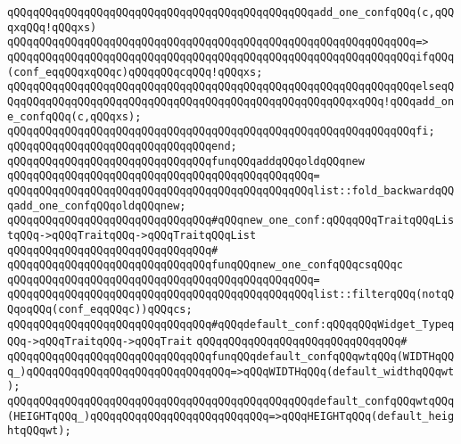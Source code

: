 \newline
\verb|qQQqqQQqqQQqqQQqqQQqqQQqqQQqqQQqqQQqqQQqqQQqqQQqadd_one_confqQQq(c,qQQqxqQQq!qQQqxs)|\newline
\verb|qQQqqQQqqQQqqQQqqQQqqQQqqQQqqQQqqQQqqQQqqQQqqQQqqQQqqQQqqQQqqQQq=>|\newline
\verb|qQQqqQQqqQQqqQQqqQQqqQQqqQQqqQQqqQQqqQQqqQQqqQQqqQQqqQQqqQQqqQQqifqQQq(conf_eqqQQqxqQQqc)qQQqqQQqcqQQq!qQQqxs;|\newline
\verb|qQQqqQQqqQQqqQQqqQQqqQQqqQQqqQQqqQQqqQQqqQQqqQQqqQQqqQQqqQQqqQQqelseqQQqqQQqqQQqqQQqqQQqqQQqqQQqqQQqqQQqqQQqqQQqqQQqqQQqqQQqxqQQq!qQQqadd_one_confqQQq(c,qQQqxs);|\newline
\verb|qQQqqQQqqQQqqQQqqQQqqQQqqQQqqQQqqQQqqQQqqQQqqQQqqQQqqQQqqQQqqQQqfi;|\newline
\verb|qQQqqQQqqQQqqQQqqQQqqQQqqQQqqQQqend;|\newline
\newline
\verb|qQQqqQQqqQQqqQQqqQQqqQQqqQQqqQQqfunqQQqaddqQQqoldqQQqnew|\newline
\verb|qQQqqQQqqQQqqQQqqQQqqQQqqQQqqQQqqQQqqQQqqQQqqQQq=|\newline
\verb|qQQqqQQqqQQqqQQqqQQqqQQqqQQqqQQqqQQqqQQqqQQqqQQqlist::fold_backwardqQQqadd_one_confqQQqoldqQQqnew;|\newline
\newline
\verb|qQQqqQQqqQQqqQQqqQQqqQQqqQQqqQQq#qQQqnew_one_conf:qQQqqQQqTraitqQQqListqQQq->qQQqTraitqQQq->qQQqTraitqQQqList|\newline
\verb|qQQqqQQqqQQqqQQqqQQqqQQqqQQqqQQq#|\newline
\verb|qQQqqQQqqQQqqQQqqQQqqQQqqQQqqQQqfunqQQqnew_one_confqQQqcsqQQqc|\newline
\verb|qQQqqQQqqQQqqQQqqQQqqQQqqQQqqQQqqQQqqQQqqQQqqQQq=|\newline
\verb|qQQqqQQqqQQqqQQqqQQqqQQqqQQqqQQqqQQqqQQqqQQqqQQqlist::filterqQQq(notqQQqoqQQq(conf_eqqQQqc))qQQqcs;|\newline
\newline
\verb|qQQqqQQqqQQqqQQqqQQqqQQqqQQqqQQq#qQQqdefault_conf:qQQqqQQqWidget_TypeqQQq->qQQqTraitqQQq->qQQqTrait|\newline
\verb|qQQqqQQqqQQqqQQqqQQqqQQqqQQqqQQq#|\newline
\verb|qQQqqQQqqQQqqQQqqQQqqQQqqQQqqQQqfunqQQqdefault_confqQQqwtqQQq(WIDTHqQQq_)qQQqqQQqqQQqqQQqqQQqqQQqqQQqqQQq=>qQQqWIDTHqQQq(default_widthqQQqwt);|\newline
\verb|qQQqqQQqqQQqqQQqqQQqqQQqqQQqqQQqqQQqqQQqqQQqqQQqdefault_confqQQqwtqQQq(HEIGHTqQQq_)qQQqqQQqqQQqqQQqqQQqqQQqqQQq=>qQQqHEIGHTqQQq(default_heightqQQqwt);|\newline
